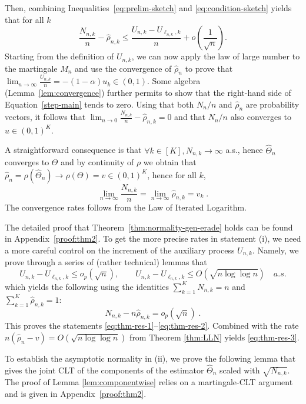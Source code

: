 \documentclass[11pt]{article}
\theoremstyle{plain}
\theoremstyle{definition}
\begin{document}
Then, combining Inequalities~\eqref{eq:prelim-sketch} and \eqref{eq:condition-sketch} yields that for all $k$
\begin{equation}\label{step-main}\frac{N_{n,k}}{n} - \hat{\rho}_{n,k} \leq \frac{U_{n,k}- U_{\ell_{n,k},k}}{n} + o\left(\frac{1}{\sqrt{n}}\right).\end{equation}
Starting from the definition of $U_{n,k}$, we can now apply the law of large number to the martingale $M_n$ and use the convergence of $\hat{\rho}_{n}$ to prove that $\lim_{n\rightarrow \infty} \frac{U_{n,k}}{n} = -(1-\alpha)u_k \in (0,1)$. Some algebra (Lemma~\ref{lem:convergence}) further permits to show that the right-hand side of Equation~\eqref{step-main} tends to zero. Using that both $N_n/n$ and $\hat{\rho}_n$ are probability vectors, it follows that $\lim_{n\rightarrow 0} \frac{N_{n,k}}{n} - \hat{\rho}_{n,k} = 0$ and that ${N_{n}}/{n}$ also converges to $u \in (0,1)^K$.

A straightforward consequence is that $\forall k \in [K], N_{n,k} \to \infty$ a.s., hence $\hat{\Theta}_n$ converges to $\Theta$ and by continuity of \(\rho\) we obtain that \(\hat{\rho}_n = \rho(\hat{\Theta}_n) \to \rho(\Theta) = v \in (0,1)^K\), hence for all $k$,
	\[
	\lim_{n \to \infty} \frac{N_{n,k}}{n} = \lim_{n \to \infty} \hat{\rho}_{n,k} = v_k\;.
	\]
	The convergence rates follows from the Law of Iterated Logarithm.

	\smallskip

	The detailed proof that Theorem~\ref{thm:normality-gen-erade} holds can be found in Appendix~\ref{proof:thm2}. To get the more precise rates in statement (i), we need a more careful control on the increment of the auxiliary process $U_{n,k}$. Namely, we prove through a series of (rather technical) lemmas that
	\[
	U_{n,k}-U_{\ell_{n,k},k}\leq o_p(\sqrt n),
	\qquad
	U_{n,k}-U_{\ell_{n,k},k}\leq O(\sqrt{n\log\log n}) \quad a.s.
	\]
	which yields the following using the identities $\sum_{k=1}^K N_{n,k}=n$ and $\sum_{k=1}^K \hat\rho_{n,k}=1$:
	\[
	N_{n,k}-n\hat\rho_{n,k}=o_p(\sqrt n)\;.
	\]
    This proves the statements \eqref{eq:thm-res-1}--\eqref{eq:thm-res-2}. 	Combined with the rate \(n(\hat\rho_n-v)=O(\sqrt{n\log\log n})\)
	from Theorem \ref{thm:LLN} yields \eqref{eq:thm-res-3}.
	
	To establish the asymptotic normality in (ii), we prove the following lemma that gives the joint CLT of the components of the estimator \(\hat{\Theta}_n\) scaled with \(\sqrt{N_{n,k}}\). The proof of Lemma \ref{lem:componentwise} relies on a martingale-CLT argument and is given in Appendix~\ref{proof:thm2}.
	
\end{document}

